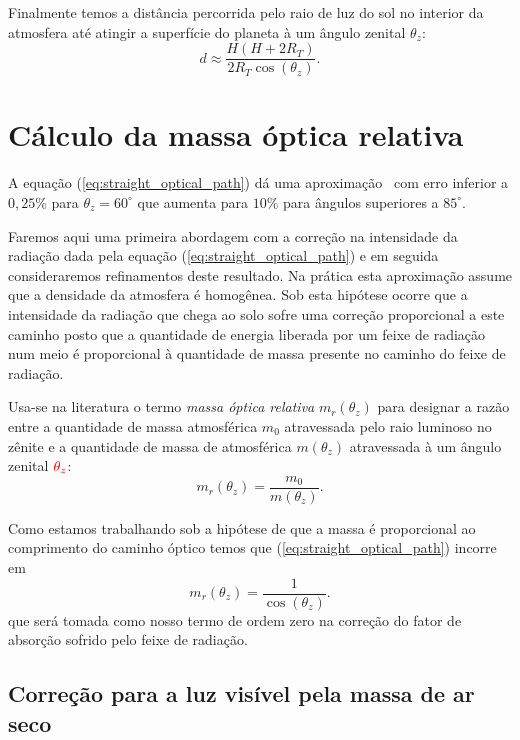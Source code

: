 \documentclass[12pt,a4paper]{article}
\begin{document}
	Finalmente temos a distância percorrida pelo raio de luz do sol
	no interior da atmosfera até atingir a superfície do planeta à um ângulo
	zenital $\theta_z$:
	\begin{equation}
		 \boxed{d \approx \frac{H(H + 2R_T)}{2{R_T}\cos(\theta_z)}.} \label{eq:straight_optical_path}
	\end{equation}

	\section{Cálculo da massa óptica relativa}

	A equação (\ref{eq:straight_optical_path}) dá uma
	aproximação~\cite{muhamad_iqbal} com erro inferior a $0,25\%$ para
	$\theta_z=60^{\circ}$ que aumenta para $10\%$ para ângulos superiores a
	$85^{\circ}$. 

	Faremos aqui uma primeira abordagem com a correção na intensidade da
	radiação dada pela equação (\ref{eq:straight_optical_path}) e em seguida
	consideraremos refinamentos deste resultado. Na prática esta aproximação
	assume que a densidade da atmosfera é homogênea. Sob esta hipótese ocorre
	que a intensidade da radiação que chega ao solo sofre uma correção
	proporcional a este caminho posto que a quantidade de energia liberada por
	um feixe de radiação num meio é proporcional à quantidade de massa presente
	no caminho do feixe de radiação.

	Usa-se na literatura o termo \emph{massa óptica relativa} $m_r(\theta_z)$ para
	designar a razão entre a quantidade de massa atmosférica $m_0$ atravessada
	pelo raio luminoso no zênite e a quantidade de massa de atmosférica $m(\theta_z)$
	atravessada à um ângulo zenital $\color{red}{\theta_z}$:
	\begin{equation}
		m_r (\theta_z) = \frac{m_0}{m(\theta_z)}.
	\end{equation}

	Como estamos trabalhando sob a hipótese de que a massa é proporcional ao
	comprimento do caminho óptico temos que (\ref{eq:straight_optical_path})
	incorre em 
	\begin{equation}
		m_r (\theta_z) = \frac{1}{\cos(\theta_z)}. \label{eq:0-th_order_optical_mass_correction}
	\end{equation}
	que será tomada como nosso termo de ordem zero na correção do fator de
	absorção sofrido pelo feixe de radiação.

	\subsection{Correção para a luz visível pela massa de ar seco }
\end{document}
